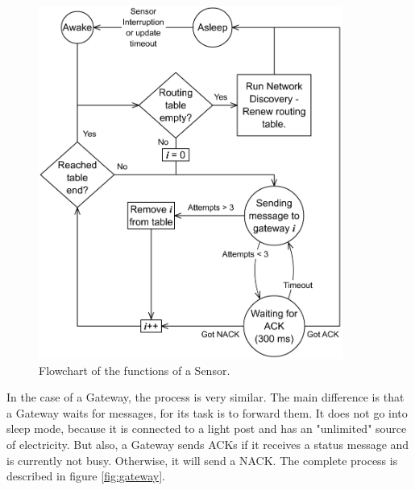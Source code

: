 \begin{figure}
    \centering
    \includegraphics[width=10cm]{images/Flowchart_Mote.png}
	\vspace{-1.5em}
    \caption{Flowchart of the functions of a Sensor.}
    \vspace{-1.5em}
    \label{fig:sensor}
\end{figure}

In the case of a Gateway, the process is very similar. 
The main difference is that a Gateway waits for messages, for its task is to forward them.
It does not go into sleep mode, because it is connected to a light post and has an "unlimited" source of electricity.
But also, a Gateway sends ACKs if it receives a status message and is currently not busy.
Otherwise, it will send a NACK. The complete process is described in figure \ref{fig:gateway}.

